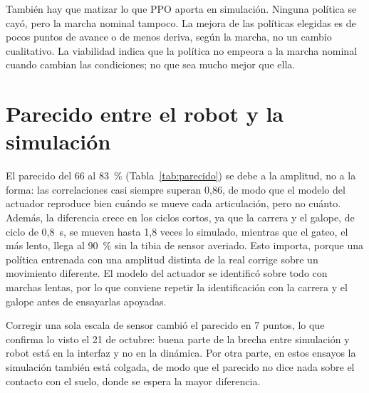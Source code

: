 También hay que matizar lo que PPO aporta en simulación. Ninguna política se cayó,
pero la marcha nominal tampoco. La mejora de las políticas elegidas es de pocos puntos
de avance o de menos deriva, según la marcha, no un cambio cualitativo. La viabilidad
indica que la política no empeora a la marcha nominal cuando cambian las condiciones;
no que sea mucho mejor que ella.

\section{Parecido entre el robot y la simulación}

El parecido del 66 al 83~\% (Tabla~\ref{tab:parecido}) se debe a la amplitud, no a la
forma: las correlaciones casi siempre superan 0,86, de modo que el modelo del actuador
reproduce bien cuándo se mueve cada articulación, pero no cuánto. Además, la diferencia
crece en los ciclos cortos, ya que la carrera y el galope, de ciclo de 0,8~s, se mueven hasta 1,8 veces lo simulado, mientras que el gateo, el más lento, llega al 90~\% sin la tibia de sensor averiado.
Esto importa, porque una política entrenada con una amplitud distinta de la real
corrige sobre un movimiento diferente. El modelo del actuador se identificó sobre todo
con marchas lentas, por lo que conviene repetir la identificación con la carrera y el
galope antes de ensayarlas apoyadas.

Corregir una sola escala de sensor cambió el parecido en 7 puntos, lo que confirma lo
visto el 21 de octubre: buena parte de la brecha entre simulación y robot está en
la interfaz y no en la dinámica. Por otra parte, en estos ensayos la simulación
también está colgada, de modo que el parecido no dice nada sobre el contacto con el
suelo, donde se espera la mayor diferencia.
